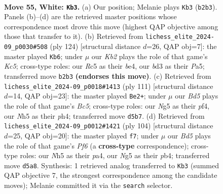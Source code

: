\documentclass[11pt]{article}
\begin{document}
\clearpage

\begin{figure}[p]\centering
\begin{subfigure}{0.46\textwidth}\centering
\resizebox{\linewidth}{!}{%
\newchessgame
\chessboard[
  setfen={3r4/8/1k6/2RB1pNN/1P6/3b4/1K4P1/8 w - - 6 55},
  showmover=false,
  pgfstyle=straightmove, color=movearrow, markmove={b2-b3}
]}
\caption{}
\end{subfigure}\hfill
\begin{subfigure}{0.46\textwidth}\centering
\resizebox{\linewidth}{!}{%
\newchessgame
\chessboard[
  setfen={8/7p/7P/P1K1R1B1/4b3/2P2k2/8/6r1 w - - 11 63},
  showmover=false,
  pgfstyle=straightmove, color=movearrow, markmove={c5-b6}
]}
\caption{}
\end{subfigure}
\\[4pt]
\begin{subfigure}{0.46\textwidth}\centering
\resizebox{\linewidth}{!}{%
\newchessgame
\chessboard[
  setfen={8/4k3/1R6/4Bp1p/2b2P1P/1p6/2r5/3K4 b - - 14 56},
  showmover=false,
  pgfstyle=straightmove, color=movearrow, markmove={c4-e2}
]}
\caption{}
\end{subfigure}\hfill
\begin{subfigure}{0.46\textwidth}\centering
\resizebox{\linewidth}{!}{%
\newchessgame
\chessboard[
  setfen={8/6R1/5P2/3p1rBk/pp6/8/P7/4K3 w - - 0 53},
  showmover=false,
  pgfstyle=straightmove, color=movearrow, markmove={f6-f7}
]}
\caption{}
\end{subfigure}
\caption{\textbf{Move 55, White: \texttt{Kb3}.} (a) Our position; Melanie plays \texttt{Kb3} (\texttt{b2b3}). Panels (b)--(d) are the retrieved master positions whose correspondence most drove this move (highest QAP objective among those that transfer to it). (b) Retrieved from \texttt{lichess\_elite\_2024-09\_p0030\#508} (ply 124) [structural distance $d$=26, QAP obj=7]: the master played \texttt{Kb6}; under $\mu$ our \emph{Kb2} plays the role of that game's \emph{Kc5}; cross-type roles: our \emph{R}c5 as their \emph{b}e4, our \emph{b}d3 as their \emph{P}a5; transferred move \texttt{b2b3} \textbf{(endorses this move)}. (c) Retrieved from \texttt{lichess\_elite\_2024-09\_p0018\#1413} (ply 111) [structural distance $d$=14, QAP obj=23]: the master played \texttt{Be2+}; under $\mu$ our \emph{Bd5} plays the role of that game's \emph{Bc5}; cross-type roles: our \emph{N}g5 as their \emph{p}f4, our \emph{N}h5 as their \emph{p}h4; transferred move \texttt{d5b7}. (d) Retrieved from \texttt{lichess\_elite\_2024-09\_p0012\#1421} (ply 104) [structural distance $d$=25, QAP obj=20]: the master played \texttt{f7}; under $\mu$ our \emph{Bd5} plays the role of that game's \emph{Pf6} (a \textbf{cross-type} correspondence); cross-type roles: our \emph{N}h5 as their \emph{p}a4, our \emph{N}g5 as their \emph{p}b4; transferred move \texttt{d5a8}. Synthesis: 1 retrieved analog transferred to \texttt{Kb3} (summed QAP objective 7, the strongest correspondence among the candidate moves); Melanie committed it via the \texttt{search} selector.}
\label{fig:thought-m108}
\end{figure}
\end{document}
